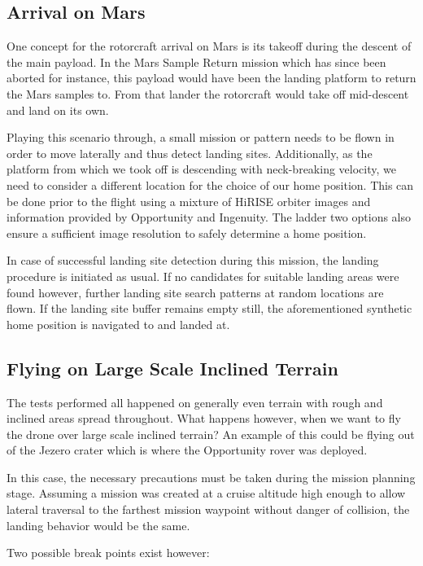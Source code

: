 \subsection{Arrival on Mars}
One concept for the rotorcraft arrival on Mars is its takeoff during the descent of the main payload. In the Mars Sample Return mission which has since been aborted for instance, this payload would have been the landing platform to return the Mars samples to. From that lander the rotorcraft would take off mid-descent and land on its own.

Playing this scenario through, a small mission or pattern needs to be flown in order to move laterally and thus detect landing sites. Additionally, as the platform from which we took off is descending with neck-breaking velocity, we need to consider a different location for the choice of our home position. This can be done prior to the flight using a mixture of HiRISE orbiter images and information provided by Opportunity and Ingenuity. The ladder two options also ensure a sufficient image resolution to safely determine a home position.

In case of successful landing site detection during this mission, the landing procedure is initiated as usual. If no candidates for suitable landing areas were found however, further landing site search patterns at random locations are flown. If the landing site buffer remains empty still, the aforementioned synthetic home position is navigated to and landed at.

\subsection{Flying on Large Scale Inclined Terrain}
The tests performed all happened on generally even terrain with rough and inclined areas spread throughout. What happens however, when we want to fly the drone over large scale inclined terrain? An example of this could be flying out of the Jezero crater which is where the Opportunity rover was deployed.

In this case, the necessary precautions must be taken during the mission planning stage. Assuming a mission was created at a cruise altitude high enough to allow lateral traversal to the farthest mission waypoint without danger of collision, the landing behavior would be the same. 

Two possible break points exist however:

